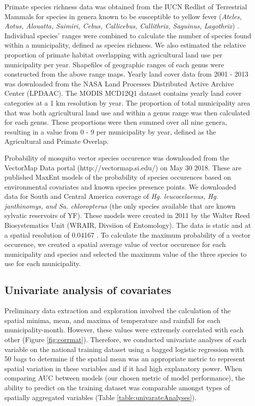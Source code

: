 \documentclass{article}
\begin{document}
Primate species richness data was obtained from the IUCN Redlist of Terrestrial Mammals for species in genera known to be susceptible to yellow fever (\textit{Ateles, Aotus, Alouatta, Saimiri, Cebus, Callicebus, Callithrix, Saguinus, Lagothrix}) \cite{bicca-marques2010,hamrick2017}. Individual species' ranges were combined to calculate the number of species found within a municipality, defined as species richness. We also estimated the relative proportion of primate habitat overlapping with agricultural land use per municipality per year. Shapefiles of geographic ranges of each genus were constructed from the above range maps. Yearly land cover data from 2001 - 2013 was downloaded from the NASA Land Processes Distributed Active Archive Center (LPDAAC). The MODIS MCD12Q1 dataset contains yearly land cover categories at a 1 km resolution by year. The proportion of total municipality area that was both agricultural land use and within a genus range was then calculated for each genus.  These proportions were then summed over all nine genera, resulting in a value from 0 - 9 per municipality by year, defined as the Agricultural and Primate Overlap.

Probability of mosquito vector species occurence was downloaded from the VectorMap Data portal (http://vectormap.si.edu/) on May 30 2018. These are published MaxEnt models of the probability of species occurences based on environmental covariates and known species presence points. We downloaded data for South and Central America coverage of \textit{Hg. leucocelaenus, Hg. janthinomys, and Sa. chloropterus} (the only species available that are known sylvatic reservoirs of YF). These models were
created in 2011 by the Walter Reed Biosystematics Unit (WRAIR, Divsiion of Entomology). The data is static and at a spatial resolution of 0.04167 \degree. To calculate the maximum probability of a vector occurence, we created a spatial average value of vector occurence for each municipality and species and selected the maximum value of the three species to use for each municipality.

\subsection{Univariate analysis of covariates}

Preliminary data extraction and exploration involved the calculation of the spatial minima, mean, and maxima of temperature and rainfall for each municipality-month.
However, these values were extremely correlated with each other (Figure \ref{fig:corrmat}).
Therefore, we conducted univariate analyses of each variable on the national training dataset using a bagged logistic regression with 50 bags to determine if the spatial mean was an appropriate metric to represent spatial variation in these variables and if it had high explanatory power.
When comparing AUC between models (our chosen metric of model performance), the ability to predict on the training dataset was comparable amongst types of spatially aggregated variables (Table \ref{table:univarateAnalyses}).
\end{document}
